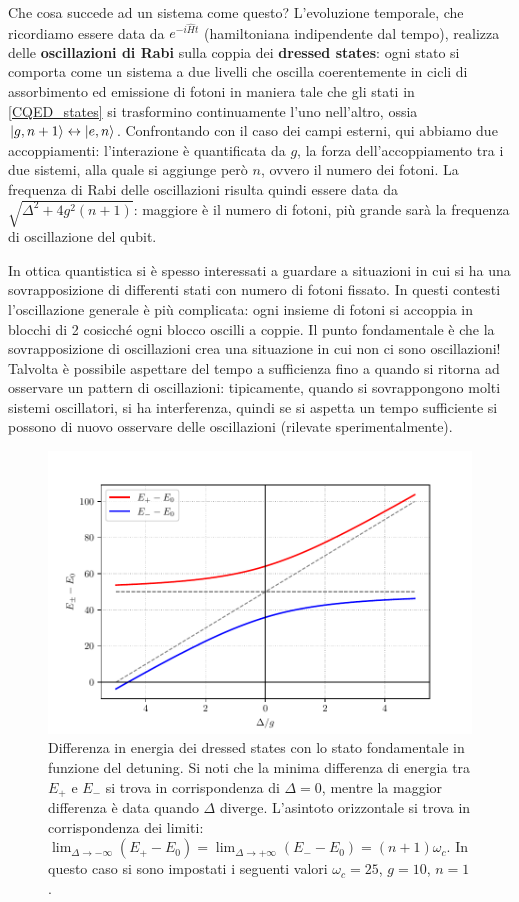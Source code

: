 \noindent Che cosa succede ad un sistema come questo? L'evoluzione temporale, che ricordiamo essere data da $e^{-i\hat H t}$ (hamiltoniana indipendente dal tempo), realizza delle \textbf{oscillazioni di Rabi} sulla coppia dei \textbf{dressed states}: ogni stato si comporta come un sistema a due livelli che oscilla coerentemente in cicli di assorbimento ed emissione di fotoni in maniera tale che gli stati in \eqref{CQED_states} si trasformino continuamente l'uno nell'altro, ossia $\ket{g,n+1} \leftrightarrow \ket{e,n}$. Confrontando con il caso dei campi esterni, qui abbiamo due accoppiamenti: l'interazione è quantificata da $g$, la forza dell'accoppiamento tra i due sistemi, alla quale si aggiunge però $n$, ovvero il numero dei fotoni. La frequenza di Rabi delle oscillazioni risulta quindi essere data da $\sqrt{\Delta^2+4g^2(n+1)}$: maggiore è il numero di fotoni, più grande sarà la frequenza di oscillazione del qubit.

\noindent In ottica quantistica si è spesso interessati a guardare a situazioni in cui si ha una sovrapposizione di differenti stati con numero di fotoni fissato. In questi contesti l'oscillazione generale è più complicata: ogni insieme di fotoni si accoppia in blocchi di 2 cosicché ogni blocco oscilli a coppie. Il punto fondamentale è che la sovrapposizione di oscillazioni crea una situazione in cui non ci sono oscillazioni! Talvolta è possibile aspettare del tempo a sufficienza fino a quando si ritorna ad osservare un pattern di oscillazioni: tipicamente, quando si sovrappongono molti sistemi oscillatori, si ha interferenza, quindi se si aspetta un tempo sufficiente si possono di nuovo osservare delle oscillazioni (rilevate sperimentalmente).   

\begin{figure}[!ht]
    \centering
    \includegraphics[scale=1]{images/graph.pdf}
    \caption{Differenza in energia dei dressed states con lo stato fondamentale in funzione del detuning. Si noti che la minima differenza di energia tra $E_+$ e $E_-$ si trova in corrispondenza di $\Delta = 0$, mentre la maggior differenza è data quando $\Delta$ diverge. L'asintoto orizzontale si trova in corrispondenza dei limiti: $\lim_{\Delta \to -\infty} (E_+-E_0) = \lim_{\Delta \to +\infty} (E_--E_0) = (n+1) \omega_c$. In questo caso si sono impostati i seguenti valori $\omega_c = 25$, $g=10$, $n=1$.}
    \label{fig:plot-dressed-states-detuning}
\end{figure}

